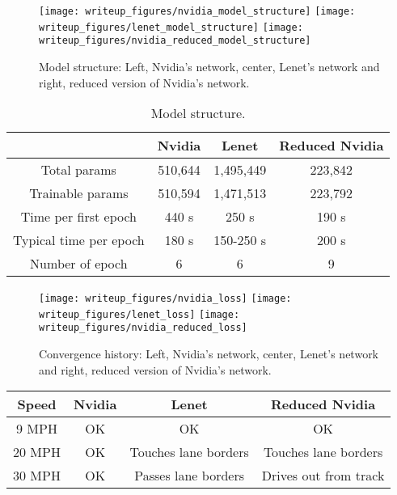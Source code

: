 \documentclass[12pt,a4paper]{article}
\begin{document}
	
	\begin{figure}[H]
		\centering
		\texttt{[image: writeup\_figures/nvidia\_model\_structure]}
		\texttt{[image: writeup\_figures/lenet\_model\_structure]}		\texttt{[image: writeup\_figures/nvidia\_reduced\_model\_structure]}
		\caption{Model structure: Left, Nvidia's network, center, Lenet's network and right, reduced version of Nvidia's network.}
		\label{fig:models}
	\end{figure}



\begin{table}[H]
	\centering
	\begin{tabular}{|c|c|c|c|}
		\hline 
		&Nvidia  &Lenet  &Reduced Nvidia  \\ 
		\hline 
		Total params &   510,644& 1,495,449 & 223,842 \\ 
		\hline 
		Trainable params & 510,594 & 1,471,513 & 223,792\\ 
		\hline 
		Time per first epoch &  440 s& 250 s & 190 s\\ 
		\hline 
		Typical time per epoch & 180 s & 150-250 s & 200 s\\ 
		\hline 
		Number of epoch& 6 & 6  & 9 \\ 
		\hline 
	\end{tabular}
	\caption{Model structure.}
	\label{fig:table1}
\end{table}


\begin{figure}[H]
	\centering
	\texttt{[image: writeup\_figures/nvidia\_loss]}
	\texttt{[image: writeup\_figures/lenet\_loss]}		\texttt{[image: writeup\_figures/nvidia\_reduced\_loss]}
	\caption{Convergence history: Left, Nvidia's network, center, Lenet's network and right, reduced version of Nvidia's network.}
	\label{fig:models}
\end{figure}

\begin{tabular}{|c|c|c|c|}
	\hline 
	Speed &Nvidia  &Lenet  &Reduced Nvidia  \\ 
	\hline 
	9 MPH  &   OK& OK & OK \\ 
	\hline 
	20 MPH& OK & Touches lane borders & Touches lane borders\\ 
	\hline 
	30 MPH&  OK& Passes lane borders & Drives out from track\\ 
	\hline  
\end{tabular} 
\end{document}
